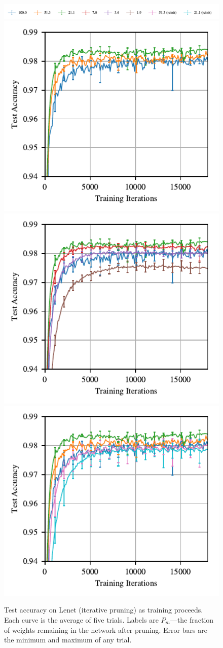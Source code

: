 \begin{figure}
\centering
\includegraphics[width=.7\textwidth]{graphs/mnist/lenet/vanilla/legend_run_test_accuracy4}%
\vspace{-.65em}
\includegraphics[width=.33\textwidth]{graphs/mnist/lenet/vanilla/run_test_accuracy1}%
\includegraphics[width=.33\textwidth]{graphs/mnist/lenet/vanilla/run_test_accuracy2}%
\includegraphics[width=.33\textwidth]{graphs/mnist/lenet/vanilla/run_test_accuracy3}%
\caption{Test accuracy on Lenet (iterative pruning) as training proceeds.
Each curve is the average of five trials. Labels are $P_m$---the fraction of weights remaining in the network
after pruning. Error bars are the minimum
and maximum of any trial.}
\label{fig:oneshot_same_init_convergence}
\end{figure}

